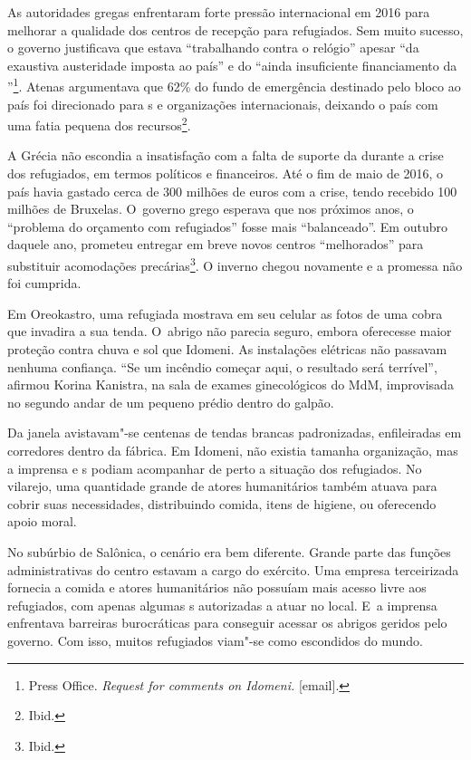 As autoridades gregas enfrentaram forte pressão internacional em 2016
para melhorar a qualidade dos centros de recepção para refugiados. Sem
muito sucesso, o governo justificava que estava ``trabalhando contra
o relógio'' apesar ``da exaustiva austeridade imposta ao país'' e do
``ainda insuficiente financiamento da ''\footnote{ Press Office. \emph{Request for comments on
Idomeni}\emph{.} {[}email{]}.}. Atenas
argumentava que 62\% do fundo de emergência destinado pelo bloco ao país foi
direcionado para s e organizações internacionais, deixando o país com
uma fatia pequena dos recursos\footnote{ Ibid.}.

A Grécia não escondia a insatisfação com a falta de suporte da  durante
a crise dos refugiados, em termos políticos e financeiros. Até o fim de
maio de 2016, o país havia gastado cerca de 300 milhões de euros com a crise,
tendo recebido 100 milhões de Bruxelas. O~governo grego esperava que nos
próximos anos, o ``problema do orçamento com refugiados'' fosse mais
``balanceado''. Em outubro daquele ano, prometeu entregar em breve novos centros
``melhorados'' para substituir acomodações
precárias\footnote{ Ibid.}. O inverno chegou novamente e a promessa não foi cumprida. 

Em Oreokastro, uma refugiada mostrava em seu celular as fotos de uma
cobra que invadira a sua tenda. O~abrigo não parecia seguro, embora
oferecesse maior proteção contra chuva e sol que Idomeni. As instalações
elétricas não passavam nenhuma confiança. ``Se um incêndio começar aqui,
o resultado será terrível'', afirmou Korina Kanistra, na sala de exames
ginecológicos do MdM, improvisada no segundo andar de um pequeno prédio
dentro do galpão.

Da janela avistavam"-se centenas de tendas brancas padronizadas,
enfileiradas em corredores dentro da fábrica. Em Idomeni, não existia tamanha
organização, mas a imprensa e s podiam acompanhar de perto
a situação dos refugiados. No vilarejo, uma quantidade grande de atores
humanitários também atuava para cobrir suas necessidades, distribuindo
comida, itens de higiene, ou oferecendo apoio moral.

No subúrbio de Salônica, o cenário era bem diferente. Grande parte das
funções administrativas do centro estavam a cargo do exército. Uma
empresa terceirizada fornecia a comida e atores humanitários não
possuíam mais acesso livre aos refugiados, com apenas algumas s
autorizadas a atuar no local. E~a imprensa enfrentava barreiras
burocráticas para conseguir acessar os abrigos geridos pelo governo. Com
isso, muitos refugiados viam"-se como escondidos do mundo.

